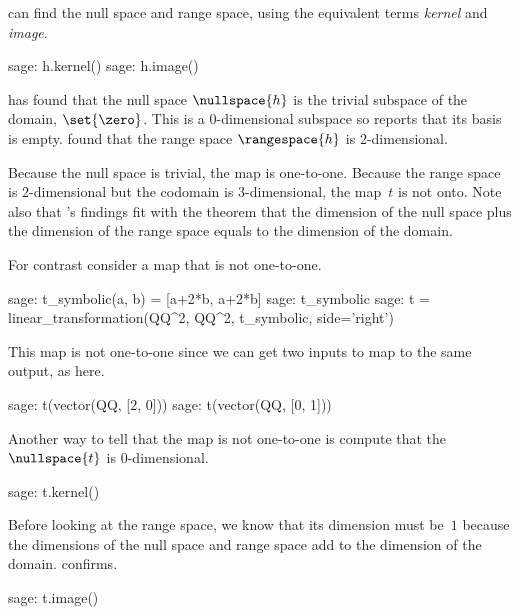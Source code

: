\Sage{} can find the null space 
and range space, using the equivalent 
terms \textit{kernel} and \textit{image}.
\begin{sagecommandline}
sage: h.kernel()                                       
sage: h.image()                                        
\end{sagecommandline}
\Sage{} has found that 
the null space $\nullspace{h}$ is the trivial subspace of the domain,
$\set{\zero}$.
This is a $0$-dimensional
subspace so \Sage{} reports that its basis is empty.
\Sage{} found that the range space $\rangespace{h}$ is $2$-dimensional. 

Because the null space is trivial, the map is one-to-one. 
Because the range space is $2$-dimensional but 
the codomain is $3$-dimensional, the map~$t$ is not onto.
Note also that \Sage's findings fit with the theorem that
the dimension of the null space plus the dimension of the 
range space equals to the dimension of the domain.

For contrast consider a map that is not one-to-one.
\begin{sagecommandline}
sage: t_symbolic(a, b) = [a+2*b, a+2*b]
sage: t_symbolic
sage: t = linear_transformation(QQ^2, QQ^2, t_symbolic, side='right')
\end{sagecommandline}
This map is not one-to-one since we can get two inputs
to map to the same output, 
as here.  
\begin{sagecommandline}
sage: t(vector(QQ, [2, 0]))
sage: t(vector(QQ, [0, 1]))
\end{sagecommandline}
\noindent
Another way to tell that the map is not one-to-one is compute that the 
$\nullspace{t}$ is $0$-dimensional.
\begin{sagecommandline}
sage: t.kernel()
\end{sagecommandline}

Before looking at the range space, we know that its dimension must be~$1$ 
because the dimensions of the null space and
range space add to the dimension of the domain.
\Sage{} confirms.
\begin{sagecommandline}
sage: t.image()
\end{sagecommandline}



